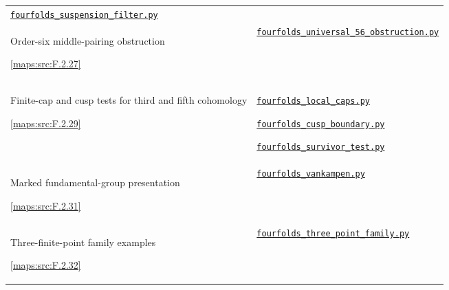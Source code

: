 \documentclass[11pt,a4paper]{article}
\numberwithin{equation}{section}
\theoremstyle{definition}
\newcommand{\SsixRepositoryCommit}{83d76022bcd442278b760db9ff438afceed6c6ea}
\begin{document}
\begin{longtable}{@{}p{}p{}@{}}
\href{https://github.com/KokunoYumeto/s6-complex-structure-workbench/blob/\SsixRepositoryCommit/pro_returns/S6_10_PAPERS_checkpoint_15_20261119T1045Z/S6_10_PAPERS/code/V/replay_chains/code/fourfolds_suspension_filter.py}{\nolinkurl{fourfolds_suspension_filter.py}} \\[3pt]
\hypertarget{prog:V:middle-pairing}{}Order-six middle-pairing obstruction\par \cref{maps:src:F.2.27} &
\href{https://github.com/KokunoYumeto/s6-complex-structure-workbench/blob/\SsixRepositoryCommit/pro_returns/S6_10_PAPERS_checkpoint_15_20261119T1045Z/S6_10_PAPERS/code/V/replay_chains/code/fourfolds_universal_56_obstruction.py}{\nolinkurl{fourfolds_universal_56_obstruction.py}} \\[3pt]
\hypertarget{prog:V:cap-tests}{}Finite-cap and cusp tests for third and fifth cohomology\par \cref{maps:src:F.2.29} &
\href{https://github.com/KokunoYumeto/s6-complex-structure-workbench/blob/\SsixRepositoryCommit/pro_returns/S6_10_PAPERS_checkpoint_15_20261119T1045Z/S6_10_PAPERS/code/V/replay_chains/code/fourfolds_local_caps.py}{\nolinkurl{fourfolds_local_caps.py}}\par \href{https://github.com/KokunoYumeto/s6-complex-structure-workbench/blob/\SsixRepositoryCommit/pro_returns/S6_10_PAPERS_checkpoint_15_20261119T1045Z/S6_10_PAPERS/code/V/replay_chains/code/fourfolds_cusp_boundary.py}{\nolinkurl{fourfolds_cusp_boundary.py}}\par \href{https://github.com/KokunoYumeto/s6-complex-structure-workbench/blob/\SsixRepositoryCommit/pro_returns/S6_10_PAPERS_checkpoint_15_20261119T1045Z/S6_10_PAPERS/code/V/replay_chains/code/fourfolds_survivor_test.py}{\nolinkurl{fourfolds_survivor_test.py}} \\[3pt]
\hypertarget{prog:V:fundamental-group}{}Marked fundamental-group presentation\par \cref{maps:src:F.2.31} &
\href{https://github.com/KokunoYumeto/s6-complex-structure-workbench/blob/\SsixRepositoryCommit/pro_returns/S6_10_PAPERS_checkpoint_15_20261119T1045Z/S6_10_PAPERS/code/V/replay_chains/code/fourfolds_vankampen.py}{\nolinkurl{fourfolds_vankampen.py}} \\[3pt]
\hypertarget{prog:V:three-points}{}Three-finite-point family examples\par \cref{maps:src:F.2.32} &
\href{https://github.com/KokunoYumeto/s6-complex-structure-workbench/blob/\SsixRepositoryCommit/pro_returns/S6_10_PAPERS_checkpoint_15_20261119T1045Z/S6_10_PAPERS/code/V/replay_chains/code/fourfolds_three_point_family.py}{\nolinkurl{fourfolds_three_point_family.py}} \\[3pt]

\end{longtable}
\end{document}

